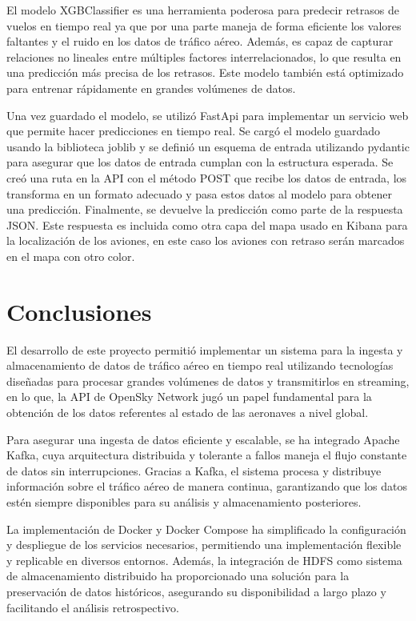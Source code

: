 \documentclass{article}
\begin{document}
El modelo XGBClassifier es una herramienta poderosa para predecir retrasos de vuelos en tiempo real ya que por una parte maneja de forma eficiente los valores faltantes y el ruido en los datos de tráfico aéreo. Además, es capaz de capturar relaciones no lineales entre múltiples factores interrelacionados, lo que resulta en una predicción más precisa de los retrasos. Este modelo también está optimizado para entrenar rápidamente en grandes volúmenes de datos. 

Una vez guardado el modelo, se utilizó FastApi para implementar un servicio web que permite hacer predicciones en tiempo real. Se cargó el modelo guardado usando la biblioteca joblib y se definió un esquema de entrada utilizando pydantic para asegurar que los datos de entrada cumplan con la estructura esperada. Se creó una ruta en la API con el método POST que recibe los datos de entrada, los transforma en un formato adecuado y pasa estos datos al modelo para obtener una predicción. Finalmente, se devuelve la predicción como parte de la respuesta JSON.
Este respuesta es incluida como otra capa del mapa usado en Kibana para la localización de los aviones, en este caso los aviones con retraso serán marcados en el mapa con otro color. 

\section{Conclusiones}

El desarrollo de este proyecto permitió implementar un sistema para la ingesta y almacenamiento de datos de tráfico aéreo en tiempo real utilizando tecnologías diseñadas para procesar grandes volúmenes de datos y transmitirlos en streaming, en lo que, la API de OpenSky Network jugó un papel fundamental para la obtención de los datos referentes al estado de las aeronaves a nivel global. 

Para asegurar una ingesta de datos eficiente y escalable, se ha integrado Apache Kafka, cuya arquitectura distribuida y tolerante a fallos maneja el flujo constante de datos sin interrupciones. Gracias a Kafka, el sistema procesa y distribuye información sobre el tráfico aéreo de manera continua, garantizando que los datos estén siempre disponibles para su análisis y almacenamiento posteriores.

La implementación de Docker y Docker Compose ha simplificado la configuración y despliegue de los servicios necesarios, permitiendo una implementación flexible y replicable en diversos entornos. Además, la integración de HDFS como sistema de almacenamiento distribuido ha proporcionado una solución para la preservación de datos históricos, asegurando su disponibilidad a largo plazo y facilitando el análisis retrospectivo.
\end{document}
